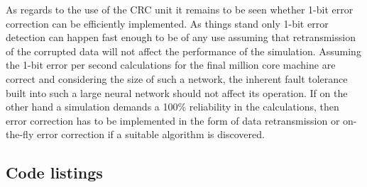 \documentclass[a4paper, 11pt]{article}
\begin{document}
As regards to the use of the CRC unit it remains to be seen whether 1-bit error correction can be efficiently implemented. As things stand only 1-bit error detection can happen fast enough to be of any use assuming that retransmission of the corrupted data will not affect the performance of the simulation. Assuming the 1-bit error per second calculations for the final million core machine are correct and considering the size of such a network, the inherent fault tolerance built into such a large neural network should not affect its operation. If on the other hand a simulation demands a 100\% reliability in the calculations, then error correction has to be implemented in the form of data retransmission or on-the-fly error correction if a suitable algorithm is discovered.

\newpage
\begin{appendices}

\section{Code listings}
%
%
\begin{multicols}{2}
\inputminted[fontsize=\tiny]{python}{code/bursting.py}
\end{multicols}
\end{appendices}

\newpage


\end{document}
